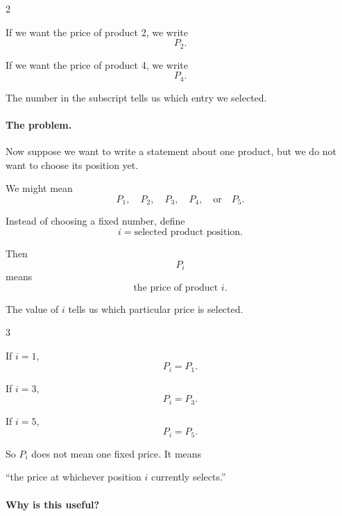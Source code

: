 	{
		\setlength{\columnseprule}{0.4pt}
		\setlength{\columnsep}{1.5em}
		\begin{multicols}{2}
			
			If we want the price of product 2, we write
			\[
			P_2.
			\]
			
			\columnbreak
			
			If we want the price of product 4, we write
			\[
			P_4.
			\]
			
		\end{multicols}
	}
	
	The number in the subscript tells us which entry we selected.
	
	\paragraph{The problem.}
	
	Now suppose we want to write a statement about one product, but we do not want to choose its position yet.
	
	We might mean
	\[
	P_1,\quad P_2,\quad P_3,\quad P_4,\quad \text{or}\quad P_5.
	\]
	
	Instead of choosing a fixed number, define
	\[
	i=\text{selected product position}.
	\]
	
	Then
	\[
	P_i
	\]
	means
	\[
	\text{the price of product }i.
	\]
	
	The value of $i$ tells us which particular price is selected.
	
	{
		\setlength{\columnseprule}{0.4pt}
		\setlength{\columnsep}{1.5em}
		\begin{multicols}{3}
			
			If $i=1$,
			\[
			P_i=P_1.
			\]
			
			\columnbreak
			
			If $i=3$,
			\[
			P_i=P_3.
			\]
			
			\columnbreak
			
			If $i=5$,
			\[
			P_i=P_5.
			\]
			
		\end{multicols}
	}
	
	So $P_i$ does not mean one fixed price. It means
	
	\begin{center}
		``the price at whichever position $i$ currently selects.''
	\end{center}
	
	\paragraph{Why is this useful?}
	
